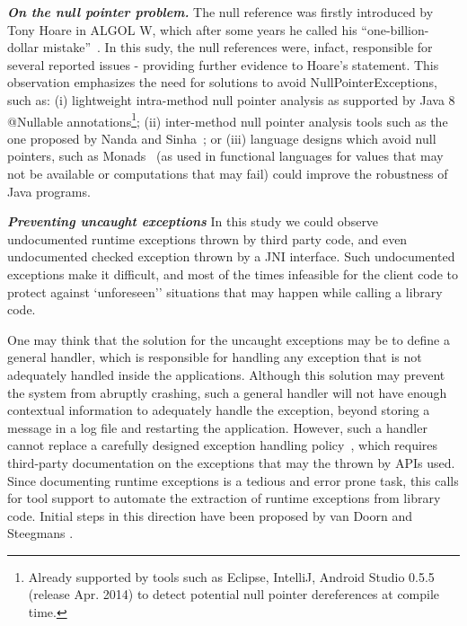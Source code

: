 \documentclass[conference]{IEEEtran}
\begin{document}

\emph{\textbf{On the null pointer problem.}}
The null reference was firstly introduced by Tony Hoare in ALGOL W, which after some years he called his ``one-billion-dollar mistake''~\cite{hoare2}.
In this sudy, the null references were, infact, responsible for several reported issues - providing further evidence to Hoare's statement.
This observation emphasizes the need for solutions to avoid NullPointerExceptions, such as:
(i) lightweight intra-method null pointer analysis as supported by
Java 8 @Nullable annotations\footnote{Already supported by tools such as Eclipse, IntelliJ, Android Studio 0.5.5 (release Apr. 2014) to detect potential 
null pointer dereferences at compile time.};
(ii) inter-method null pointer analysis tools such as the one proposed by Nanda and Sinha~\cite{nanda2009accurate};
or (iii) language designs which avoid null pointers, such 
as Monads~\cite{Walde95} (as used in functional languages for values that may not be available 
or computations that may fail) could improve the robustness of Java programs. 

\emph{\textbf{Preventing uncaught exceptions}}
In this study we could observe undocumented runtime exceptions thrown by third party code,
and even undocumented checked exception thrown by a JNI interface.
Such undocumented exceptions make it difficult, and most of the times infeasible
for the client code to protect against `unforeseen'' situations that may happen 
while calling a library code. 

One may think that the solution for the uncaught exceptions may be to define a general handler, 
which is responsible for handling any exception that is not
adequately handled inside the applications. Although this 
solution may prevent  the system from abruptly crashing,
 such a general handler will not have enough
contextual information to adequately handle the exception, 
beyond storing a message in a log file and restarting the application.
However, such a handler cannot replace a carefully designed exception 
handling policy~\cite{Robil00}, which requires
third-party documentation on the exceptions that
may the thrown by APIs used. 
Since  documenting runtime exceptions is a tedious and error prone
task, 
this calls for tool support to automate the extraction of runtime exceptions
from library code. Initial steps in this direction have been proposed
by van Doorn and Steegmans \cite{van2005combining}.
\end{document}
